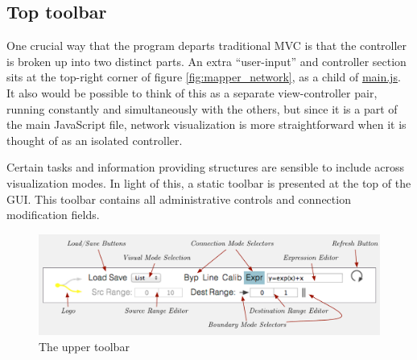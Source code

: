 
	\subsection{Top toolbar} %
	\label{sec:top_toolbar}

One crucial way that the program departs traditional MVC is that the controller is broken up into two distinct parts. An extra ``user-input'' and controller section sits at the top-right corner of figure \ref{fig:mapper_network}, as a child of \url{main.js}.  It also would be possible to think of this as a separate view-controller pair, running constantly and simultaneously with the others, but since it is a part of the main JavaScript file, network visualization is more straightforward when it is thought of as an isolated controller.

Certain tasks and information providing structures are sensible to include across visualization modes. In light of this, a static toolbar is presented at the top of the GUI. This toolbar contains all administrative controls and connection modification fields.

\begin{figure}[!ht]
\centering
	\includegraphics[width=1\textwidth]{figures/top_toolbar}
\caption{The upper toolbar}
\label{fig:toolbar}
\end{figure}

